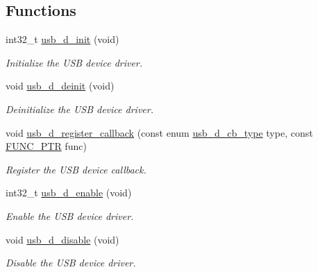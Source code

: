\subsection*{Functions}
\begin{DoxyCompactItemize}
\item 
int32\+\_\+t \hyperlink{group__doc__driver__hal__usb__device_ga5f357667fb7640cea64b82cf1f4376c9}{usb\+\_\+d\+\_\+init} (void)
\begin{DoxyCompactList}\small\item\em Initialize the U\+SB device driver. \end{DoxyCompactList}\item 
\mbox{\label{group__doc__driver__hal__usb__device_ga00e63d5eee63f22d39997734778629aa}} 
void \hyperlink{group__doc__driver__hal__usb__device_ga00e63d5eee63f22d39997734778629aa}{usb\+\_\+d\+\_\+deinit} (void)
\begin{DoxyCompactList}\small\item\em Deinitialize the U\+SB device driver. \end{DoxyCompactList}\item 
void \hyperlink{group__doc__driver__hal__usb__device_ga8ee730c27e0d709f1f44d89fa21a4bef}{usb\+\_\+d\+\_\+register\+\_\+callback} (const enum \hyperlink{hpl__usb__device_8h_a79a1dfcff6b553cb9ef5c23af4e81b65}{usb\+\_\+d\+\_\+cb\+\_\+type} type, const \hyperlink{group__doc__driver__hal__utils__macro_gae40b38bc5f5a5bd452bdd59c67d9a9cf}{F\+U\+N\+C\+\_\+\+P\+TR} func)
\begin{DoxyCompactList}\small\item\em Register the U\+SB device callback. \end{DoxyCompactList}\item 
int32\+\_\+t \hyperlink{group__doc__driver__hal__usb__device_gafbe4165a1a43238b36bb9014ce7d964c}{usb\+\_\+d\+\_\+enable} (void)
\begin{DoxyCompactList}\small\item\em Enable the U\+SB device driver. \end{DoxyCompactList}\item 
\mbox{\label{group__doc__driver__hal__usb__device_gab7b226a14c9a585eedd0a43c1a40fc3e}} 
void \hyperlink{group__doc__driver__hal__usb__device_gab7b226a14c9a585eedd0a43c1a40fc3e}{usb\+\_\+d\+\_\+disable} (void)
\begin{DoxyCompactList}\small\item\em Disable the U\+SB device driver. \end{DoxyCompactList}\item 

\end{DoxyCompactItemize}
